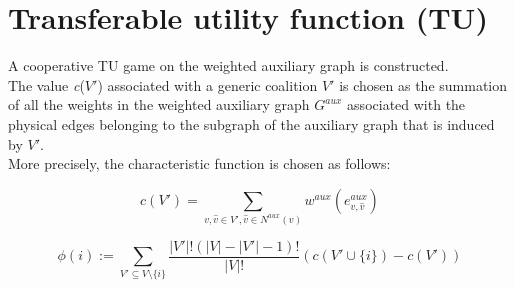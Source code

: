 \chapter{Transferable utility function (TU)}
A cooperative TU game on the weighted auxiliary graph is constructed. \\
The value \textit{c}($V'$) associated with a generic coalition $V'$ is chosen as the summation of all the weights in the weighted auxiliary graph $G^{aux}$ associated with
the physical edges belonging to the subgraph of the auxiliary graph that is induced by $V'$.\\
More precisely, the characteristic function is chosen as follows:


\begin{center}
    \begin{equation}
    c(V') = \sum_{v, \hat{v} \in V', \hat{v} \in N^{aux}(v)} w^{aux}(e^{aux}_{v, \hat{v}})
    \end{equation}
\end{center}
    
\begin{center}
    \begin{equation}
    \phi(i) := \sum_{V'\subseteq V\setminus \{i\}} \frac{|V'|! (|V|-|V'|-1)!}{|V|!} (c(V' \cup \{i\}) - c(V'))
    \end{equation}
\end{center}
    